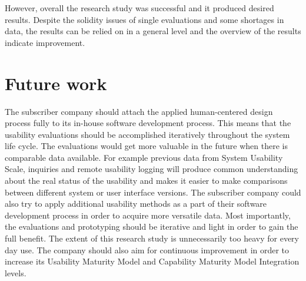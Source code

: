 \documentclass[12pt,a4paper,oneside,pdftex]{report}
\begin{document}

However, overall the research study was successful and it produced desired results. Despite the solidity issues of single evaluations and some shortages in data, the results can be relied on in a general level and the overview of the results indicate improvement.


\section{Future work}
\label{sec:future}
The subscriber company should attach the applied human-centered design process fully to its in-house software development process. This means that the usability evaluations should be accomplished iteratively throughout the system life cycle. 
The evaluations would get more valuable in the future when there is comparable data available. For example previous data from System Usability Scale, inquiries and remote usability logging will produce common understanding about the real status of the usability and makes it easier to make comparisons between different system or user interface versions. The subscriber company could also try to apply additional usability methods as a part of their software development process in order to acquire more versatile data. Most importantly, the evaluations and prototyping should be iterative and light in order to gain the full benefit. The extent of this research study is unnecessarily too heavy for every day use. The company should also aim for continuous improvement in order to increase its Usability Maturity Model and Capability Maturity Model Integration levels. 
	
\end{document}
